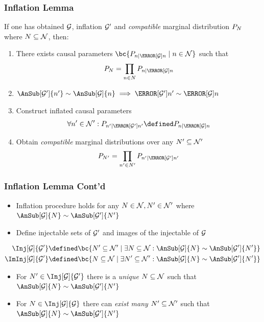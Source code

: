 \documentclass[
    hyperref={bookmarks=false},%
    xcolor={dvipsnames},
]{beamer}
\renewcommand{\term}[1]{\textcolor{Mahogany}{#1}}
\begin{document}
\begin{frame}
    \frametitle{Inflation Lemma}
    If one has obtained $\mathcal{G}$, inflation $\mathcal{G}'$ and \textit{compatible} marginal distribution $\prob[N]$ where $N \subseteq \mathcal{N}$, then:
    \begin{enumerate}
        \item There exists causal parameters $\bc{\prob[n\mid\Pa[\graph]{n}] \mid n \in \nodes}$ such that
        \[ \prob[N] = \prod_{n \in N}\prob[n\mid\Pa[\graph]{n}] \]
        \item $\AnSub[\graph']{n'} \sim \AnSub[\graph]{n} \implies \Pa[\graph']{n'} \sim \Pa[\graph]{n}$
        \item Construct \term{inflated causal parameters}
        \[ \forall n' \in \nodes' : \prob[n'\mid\Pa[\graph']{n'}] \defined \prob[n\mid\Pa[\graph]{n}]\]
        \item Obtain \textit{compatible} marginal distributions over any $N' \subseteq \mathcal{N}'$
        \[ \prob[N'] = \prod_{n' \in N'}\prob[n'\mid\Pa[\graph']{n'}] \]
    \end{enumerate}
\end{frame}

\begin{frame}
    \frametitle{Inflation Lemma Cont'd}
    \begin{itemize}
        \item Inflation procedure holds for any $N \in \mathcal{N}, N' \in \mathcal{N}'$ where $\AnSub[\graph]{N} \sim \AnSub[\graph']{N'}$
        \item Define \term{injectable sets of $\mathcal{G}'$} and \term{images of the injectable of $\mathcal{G}$}
    \end{itemize}
    \begin{align*}
        \Inj[\graph]{\graph'} &\defined \bc{N' \subseteq \nodes' \mid \exists N \subseteq \nodes : \AnSub[\graph]{N} \sim \AnSub[\graph']{N'}} \\
        \ImInj[\graph]{\graph'} &\defined \bc{N \subseteq \nodes \mid \exists N' \subseteq \nodes' : \AnSub[\graph]{N} \sim \AnSub[\graph']{N'}}
    \end{align*}
    \begin{itemize}
        \item For $N' \in \Inj[\graph]{\graph'}$ there is a \textit{unique} $N \subseteq \mathcal{N}$ such that $\AnSub[\graph]{N} \sim \AnSub[\graph']{N'}$
        \item For $N \in \Inj[\graph]{\graph}$ there can \textit{exist many} $N' \subseteq \mathcal{N}'$ such that $\AnSub[\graph]{N} \sim \AnSub[\graph']{N'}$
    \end{itemize}
\end{frame}
\end{document}
